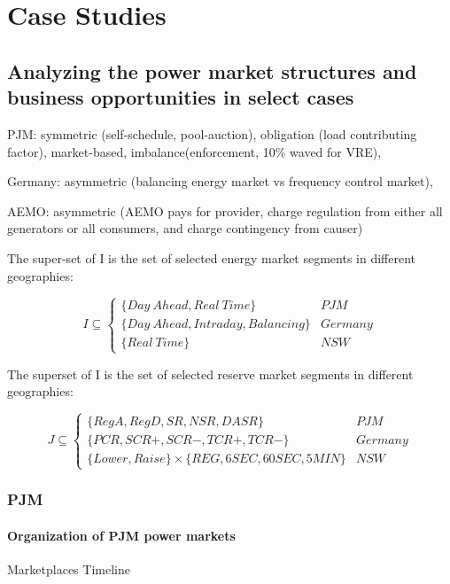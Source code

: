 \chapter{Case Studies}
\section{Analyzing the power market structures and business opportunities in select cases}

PJM: symmetric (self-schedule, pool-auction), obligation (load contributing factor), market-based, imbalance(enforcement, 10\% waved for VRE),

Germany: asymmetric (balancing energy market vs frequency control market), 

AEMO: asymmetric (AEMO pays for provider, charge regulation from either all generators or all consumers, and charge contingency from causer)

\label{sec:qualitative-analysis}
The super-set of I is the set of selected energy market segments in different geographies:

\begin{equation*}
I \subseteq  \begin{cases}
\{Day~Ahead, Real~Time\} & PJM \\
\{Day~Ahead, Intraday, Balancing\} & Germany \\
\{Real~Time\} & NSW
\end{cases}
\end{equation*}

The superset of I is the set of selected reserve market segments in different geographies:

\begin{equation*}
J \subseteq  \begin{cases}
\{RegA, RegD, SR, NSR, DASR\} & PJM \\
\{PCR, SCR+, SCR-, TCR+, TCR-\} & Germany \\
\{Lower, Raise\} \times \{REG, 6SEC, 60SEC, 5MIN\} & NSW
\end{cases}
\end{equation*}

\subsection{PJM}
\subsubsection{Organization of PJM power markets}
Marketplaces
Timeline

